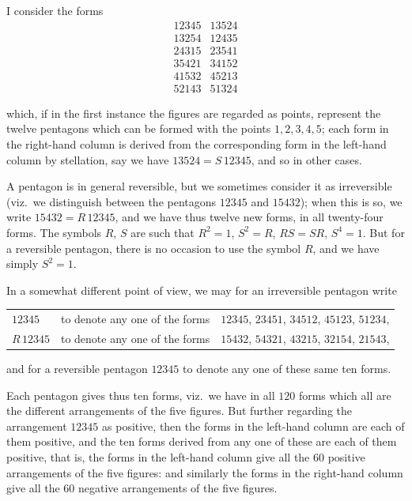 \documentclass[11pt]{article}
\begin{document}
\medskip\noindent
I consider the forms
\[
\begin{array}{cc}
12345 & 13524 \\
13254 & 12435 \\
24315 & 23541 \\
35421 & 34152 \\
41532 & 45213 \\
52143 & 51324
\end{array}
\]

which, if in the first instance the figures are regarded as points, represent the twelve pentagons which can be formed with the points $1, 2, 3, 4, 5$; each form in the right-hand column is derived from the corresponding form in the left-hand column by stellation, say we have $13524 = S\,12345$, and so in other cases.

\medskip\noindent
A pentagon is in general reversible, but we sometimes consider it as irreversible (viz.\ we distinguish between the pentagons $12345$ and $15432$); when this is so, we write $15432 = R\,12345$, and we have thus twelve new forms, in all twenty-four forms.  The symbols $R$, $S$ are such that $R^{2} = 1$, $S^{2} = R$, $RS = SR$, $S^{4} = 1$.  But for a reversible pentagon, there is no occasion to use the symbol $R$, and we have simply $S^{2} = 1$.

\medskip\noindent
In a somewhat different point of view, we may for an irreversible pentagon write
\begin{center}
\begin{tabular}{lcl}
$12345$    &to denote any one of the forms& $12345$, $23451$, $34512$, $45123$, $51234$, \\
$R\,12345$ &to denote any one of the forms& $15432$, $54321$, $43215$, $32154$, $21543$,
\end{tabular}
\end{center}
and for a reversible pentagon $12345$ to denote any one of these same ten forms.

\medskip\noindent
Each pentagon gives thus ten forms, viz.\ we have in all $120$ forms which all are the different arrangements of the five figures.  But further regarding the arrangement $12345$ as positive, then the forms in the left-hand column are each of them positive, and the ten forms derived from any one of these are each of them positive, that is, the forms in the left-hand column give all the $60$ positive arrangements of the five figures: and similarly the forms in the right-hand column give all the $60$ negative arrangements of the five figures.
\end{document}
